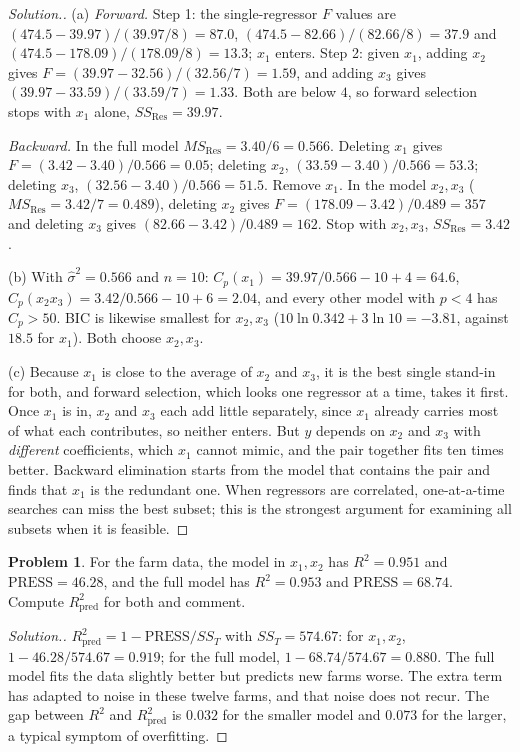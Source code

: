 \documentclass[11pt,a4paper]{article}
\numberwithin{equation}{section}
\theoremstyle{definition}
\newtheorem{problemx}{Problem}[subsection]
\newenvironment{problem}{\begin{problemx}}{\end{problemx}}
\newenvironment{solution}
  {\renewcommand{\qedsymbol}{}\begin{proof}[\textit{Solution}.]}
  {\end{proof}}
\begin{document}
\begin{solution}
(a) \emph{Forward.} Step 1: the single-regressor $F$ values are
$(474.5 - 39.97)/(39.97/8) = 87.0$, $(474.5 - 82.66)/(82.66/8) = 37.9$ and
$(474.5 - 178.09)/(178.09/8) = 13.3$; $x_1$ enters. Step 2: given $x_1$, adding $x_2$ gives
$F = (39.97 - 32.56)/(32.56/7) = 1.59$, and adding $x_3$ gives $(39.97 - 33.59)/(33.59/7) = 1.33$. Both
are below $4$, so forward selection stops with $x_1$ alone, $SS_{\mathrm{Res}} = 39.97$.

\emph{Backward.} In the full model $MS_{\mathrm{Res}} = 3.40/6 = 0.566$. Deleting $x_1$ gives
$F = (3.42 - 3.40)/0.566 = 0.05$; deleting $x_2$, $(33.59 - 3.40)/0.566 = 53.3$; deleting $x_3$,
$(32.56 - 3.40)/0.566 = 51.5$. Remove $x_1$. In the model $x_2, x_3$ ($MS_{\mathrm{Res}} = 3.42/7 = 0.489$),
deleting $x_2$ gives $F = (178.09 - 3.42)/0.489 = 357$ and deleting $x_3$ gives
$(82.66 - 3.42)/0.489 = 162$. Stop with $x_2, x_3$, $SS_{\mathrm{Res}} = 3.42$.

(b) With $\hat\sigma^2 = 0.566$ and $n = 10$:
$C_p(x_1) = 39.97/0.566 - 10 + 4 = 64.6$, $C_p(x_2x_3) = 3.42/0.566 - 10 + 6 = 2.04$, and every other
model with $p < 4$ has $C_p > 50$. BIC is likewise smallest for $x_2, x_3$
($10\ln 0.342 + 3\ln 10 = -3.81$, against $18.5$ for $x_1$). Both choose $x_2, x_3$.

(c) Because $x_1$ is close to the average of $x_2$ and $x_3$, it is the best single stand-in for both,
and forward selection, which looks one regressor at a time, takes it first. Once $x_1$ is in, $x_2$
and $x_3$ each add little separately, since $x_1$ already carries most of what each contributes,
so neither enters. But $y$ depends on $x_2$ and $x_3$ with \emph{different} coefficients, which $x_1$
cannot mimic, and the pair together fits ten times better. Backward elimination starts from the
model that contains the pair and finds that $x_1$ is the redundant one. When regressors are
correlated, one-at-a-time searches can miss the best subset; this is the strongest argument for
examining all subsets when it is feasible.
\end{solution}

\begin{problem}\label{prob:farms-press}
For the farm data, the model in $x_1, x_2$ has $R^2 = 0.951$ and $\mathrm{PRESS} = 46.28$, and the
full model has $R^2 = 0.953$ and $\mathrm{PRESS} = 68.74$. Compute $R^2_{\mathrm{pred}}$ for both and comment.
\end{problem}

\begin{solution}
$R^2_{\mathrm{pred}} = 1 - \mathrm{PRESS}/SS_T$ with $SS_T = 574.67$: for $x_1, x_2$,
$1 - 46.28/574.67 = 0.919$; for the full model, $1 - 68.74/574.67 = 0.880$. The full model fits the
data slightly better but predicts new farms worse. The extra term has adapted to noise in these twelve
farms, and that noise does not recur. The gap between $R^2$ and $R^2_{\mathrm{pred}}$ is $0.032$ for the
smaller model and $0.073$ for the larger, a typical symptom of overfitting.
\end{solution}
\end{document}
